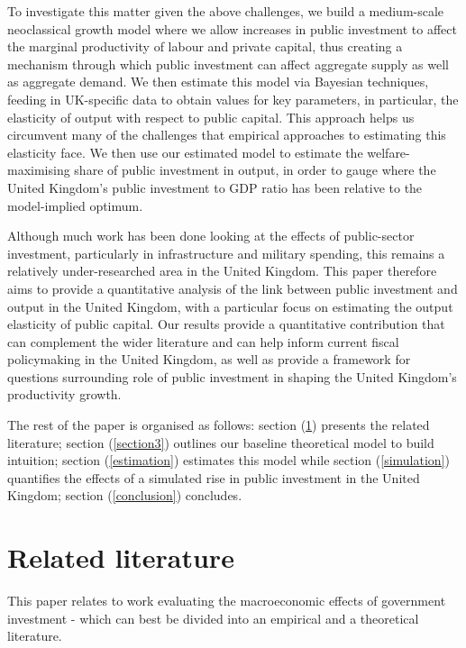 \documentclass[titlepage, 11pt, a4paper]{article}
\renewcommand{\&}{and}
\begin{document}
To investigate this matter given the above challenges, we build a medium-scale neoclassical growth model where we allow increases in public investment to affect the marginal productivity of labour and private capital, thus creating a mechanism through which public investment can affect aggregate supply as well as aggregate demand. We then estimate this model via Bayesian techniques, feeding in UK-specific data to obtain values for key parameters, in particular, the elasticity of output with respect to public capital. This approach helps us circumvent many of the challenges that empirical approaches to estimating this elasticity face.
We then use our estimated model to estimate the welfare-maximising share of public investment in output, in order to gauge where the United Kingdom's public investment to GDP ratio has been relative to the model-implied optimum.

Although much work has been done looking at the effects of public-sector investment, particularly in infrastructure and military spending, this remains a relatively under-researched area in the United Kingdom. This paper therefore aims to provide a quantitative analysis of the link between public investment and output in the United Kingdom, with a particular focus on estimating the output elasticity of public capital.
Our results provide a quantitative contribution that can complement the wider literature and can help inform current fiscal policymaking in the United Kingdom, as well as provide a framework for questions surrounding role of public investment in shaping the United Kingdom's productivity growth.  

The rest of the paper is organised as follows: section (\ref{section2}) presents the related literature; section (\ref{section3}) outlines our baseline theoretical model to build intuition; section (\ref{estimation}) estimates this model while section (\ref{simulation}) quantifies the effects of a simulated rise in public investment in the United Kingdom; section (\ref{conclusion}) concludes.


\section{Related literature} \label{section2}
This paper relates to work evaluating the macroeconomic effects of government investment - which can best be divided into an empirical and a theoretical literature. 
\end{document}
